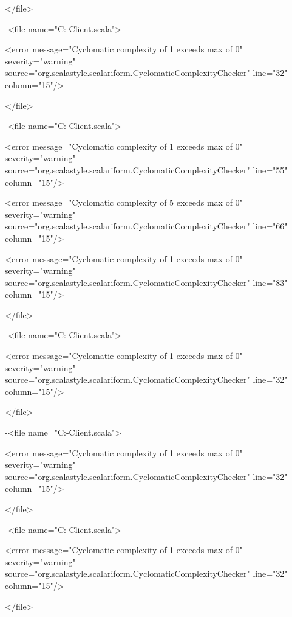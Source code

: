 \documentclass{scalatekids-article}
\begin{document}
</file>


-<file name="C:\Users\Davide\Documents\GitHub\Actorbase-Client\src\main\scala\com\actorbase\cli\models\DeleteCollectionCommand.scala">

<error message="Cyclomatic complexity of 1 exceeds max of 0" severity="warning" source="org.scalastyle.scalariform.CyclomaticComplexityChecker" line="32" column="15"/>

</file>


-<file name="C:\Users\Davide\Documents\GitHub\Actorbase-Client\src\main\scala\com\actorbase\driver\client\ActorbaseClient.scala">

<error message="Cyclomatic complexity of 1 exceeds max of 0" severity="warning" source="org.scalastyle.scalariform.CyclomaticComplexityChecker" line="55" column="15"/>

<error message="Cyclomatic complexity of 5 exceeds max of 0" severity="warning" source="org.scalastyle.scalariform.CyclomaticComplexityChecker" line="66" column="15"/>

<error message="Cyclomatic complexity of 1 exceeds max of 0" severity="warning" source="org.scalastyle.scalariform.CyclomaticComplexityChecker" line="83" column="15"/>

</file>


-<file name="C:\Users\Davide\Documents\GitHub\Actorbase-Client\src\main\scala\com\actorbase\cli\models\RenameCollectionCommand.scala">

<error message="Cyclomatic complexity of 1 exceeds max of 0" severity="warning" source="org.scalastyle.scalariform.CyclomaticComplexityChecker" line="32" column="15"/>

</file>


-<file name="C:\Users\Davide\Documents\GitHub\Actorbase-Client\src\main\scala\com\actorbase\cli\models\HelpCommand.scala">

<error message="Cyclomatic complexity of 1 exceeds max of 0" severity="warning" source="org.scalastyle.scalariform.CyclomaticComplexityChecker" line="32" column="15"/>

</file>


-<file name="C:\Users\Davide\Documents\GitHub\Actorbase-Client\src\main\scala\com\actorbase\cli\models\RemoveUserCommand.scala">

<error message="Cyclomatic complexity of 1 exceeds max of 0" severity="warning" source="org.scalastyle.scalariform.CyclomaticComplexityChecker" line="32" column="15"/>

</file>
\end{document}
